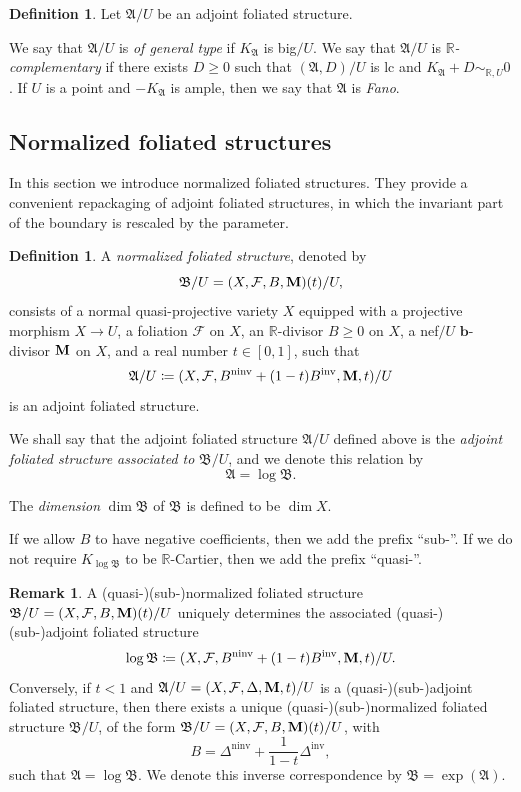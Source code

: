 \documentclass[11pt,reqno]{amsart}
\numberwithin{equation}{section}
\newcommand{\bb}{\bm{b}}
\newcommand{\Mm}{{\bf{M}}}
\newcommand{\Rr}{\mathbb{R}}
\newcommand{\ninv}{\operatorname{ninv}}
\newcommand{\inv}{\operatorname{inv}}
\newcommand{\Aa}{{\mathfrak{A}}}
\newcommand{\Bb}{{\mathfrak{B}}}
\newcommand{\Ff}{\mathcal{F}}
\theoremstyle{definition}
\newtheorem{defn}[thm]{Definition}
\newtheorem{rem}[thm]{Remark}
\begin{document}
\begin{defn}
Let $\Aa/U$ be an adjoint foliated structure. 

We say that $\Aa/U$ is \emph{of general type} if $K_{\Aa}$ is big$/U$. We say that $\Aa/U$ is \emph{$\mathbb R$-complementary} if there exists $D\geq 0$ such that $(\Aa,D)/U$ is lc and $K_{\Aa}+D\sim_{\mathbb R,U}0$. If $U$ is a point and $-K_{\Aa}$ is ample, then we say that $\Aa$ is \emph{Fano}.
\end{defn}

\subsection{Normalized foliated structures}\label{subsec: normalized foliated structure}

In this section we introduce normalized foliated structures. They provide a convenient repackaging of adjoint foliated structures, in which the invariant part of the boundary is rescaled by the parameter.

\begin{defn}
A \emph{normalized foliated structure}, denoted by $$\Bb/U=(X,\Ff,B,\Mm)(t)/U,$$ 
consists of a normal quasi-projective variety $X$ equipped with a projective morphism $X\to U$, a foliation $\Ff$ on $X$, an $\mathbb R$-divisor $B\geq 0$ on $X$, a nef$/U$ $\bb$-divisor $\Mm$ on $X$, and a real number $t\in[0,1]$, such that
\[
\Aa/U\coloneqq (X,\Ff,B^{\ninv}+(1-t)B^{\inv},\Mm,t)/U
\]
is an adjoint foliated structure.

We shall say that the adjoint foliated structure $\Aa/U$ defined above is the \emph{adjoint foliated structure associated to} $\Bb/U$, and we denote this relation by
\[
\Aa=\log\Bb.
\]

The \emph{dimension} $\dim\Bb$ of $\Bb$ is defined to be $\dim X$.

If we allow $B$ to have negative coefficients, then we add the prefix ``sub-''. If we do not require $K_{\log\Bb}$ to be $\Rr$-Cartier, then we add the prefix ``quasi-''.
\end{defn}

\begin{rem}
A (quasi-)(sub-)normalized foliated structure $\Bb/U=(X,\Ff,B,\Mm)(t)/U$ uniquely determines the associated (quasi-)(sub-)adjoint foliated structure
\[
\log\Bb\coloneqq (X,\Ff,B^{\ninv}+(1-t)B^{\inv},\Mm,t)/U.
\]
Conversely, if $t<1$ and $\Aa/U=(X,\Ff,\Delta,\Mm,t)/U$ is a (quasi-)(sub-)adjoint foliated structure, then there exists a unique (quasi-)(sub-)normalized foliated structure $\Bb/U$, of the form $\Bb/U=(X,\Ff,B,\Mm)(t)/U$, with
\[
B=\Delta^{\ninv}+\frac{1}{1-t}\Delta^{\inv},
\]
such that $\Aa=\log\Bb$. We denote this inverse correspondence by $\Bb=\exp(\Aa)$.
\end{rem}
\end{document}
